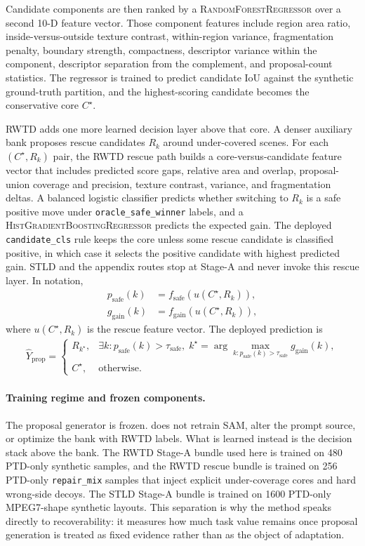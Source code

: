 Candidate components are then ranked by a \textsc{RandomForestRegressor} over a second 10-D feature vector. Those component features include region area ratio, inside-versus-outside texture contrast, within-region variance, fragmentation penalty, boundary strength, compactness, descriptor variance within the component, descriptor separation from the complement, and proposal-count statistics. The regressor is trained to predict candidate IoU against the synthetic ground-truth partition, and the highest-scoring candidate becomes the conservative core $C^\star$.

RWTD adds one more learned decision layer above that core. A denser auxiliary bank proposes rescue candidates $R_k$ around under-covered scenes. For each $(C^\star, R_k)$ pair, the RWTD rescue path builds a core-versus-candidate feature vector that includes predicted score gaps, relative area and overlap, proposal-union coverage and precision, texture contrast, variance, and fragmentation deltas. A balanced logistic classifier predicts whether switching to $R_k$ is a safe positive move under \texttt{oracle\_safe\_winner} labels, and a \textsc{HistGradientBoostingRegressor} predicts the expected gain. The deployed \texttt{candidate\_cls} rule keeps the core unless some rescue candidate is classified positive, in which case it selects the positive candidate with highest predicted gain. STLD and the appendix routes stop at Stage-A and never invoke this rescue layer.
In notation,
\begin{align}
p_{\mathrm{safe}}(k) &= f_{\mathrm{safe}}(u(C^\star, R_k)),\\
g_{\mathrm{gain}}(k) &= f_{\mathrm{gain}}(u(C^\star, R_k)),
\end{align}
where $u(C^\star, R_k)$ is the rescue feature vector. The deployed prediction is
\begin{align}
\hat{Y}_{\mathrm{prop}} =
\begin{cases}
R_{k^\star}, & \exists k : p_{\mathrm{safe}}(k) > \tau_{\mathrm{safe}}, \; k^\star = \arg\max_{k: p_{\mathrm{safe}}(k) > \tau_{\mathrm{safe}}} g_{\mathrm{gain}}(k),\\
C^\star, & \text{otherwise.}
\end{cases}
\end{align}

\paragraph{Training regime and frozen components.} The proposal generator is frozen. \sys{} does not retrain SAM, alter the prompt source, or optimize the bank with RWTD labels. What is learned instead is the decision stack above the bank. The RWTD Stage-A bundle used here is trained on 480 PTD-only synthetic samples, and the RWTD rescue bundle is trained on 256 PTD-only \texttt{repair\_mix} samples that inject explicit under-coverage cores and hard wrong-side decoys. The STLD Stage-A bundle is trained on 1600 PTD-only MPEG7-shape synthetic layouts. This separation is why the method speaks directly to recoverability: it measures how much task value remains once proposal generation is treated as fixed evidence rather than as the object of adaptation.

